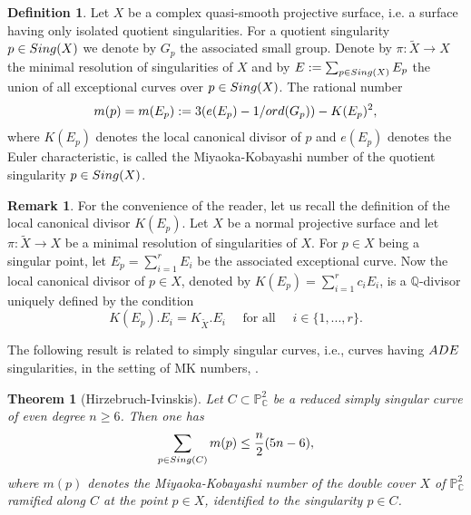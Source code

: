 \documentclass[11pt]{amsart}
\theoremstyle{plain}
\newtheorem{theorem}[thm]{Theorem}
\theoremstyle{definition}
\newtheorem{definition}[thm]{Definition}
\newtheorem{remark}[thm]{Remark}
\numberwithin{equation}{section}
\begin{document}
\begin{definition}
\label{D1}
Let $X$ be a complex quasi-smooth projective surface, i.e. a surface having only isolated quotient singularities. For a quotient singularity  $p \in {\rm Sing}(X)$ we denote by $G_{p}$ the associated small group. Denote by $\pi : \tilde{X} \rightarrow X$ the minimal resolution of singularities of $X$ and by $E:=\sum_{p \in {\rm Sing}(X)}E_{p}$ the union of all exceptional curves over $p \in {\rm Sing}(X)$. The rational number
$$m(p)=m(E_{p}):=3(e(E_{p})-1/{\rm ord}(G_{p})) - K(E_{p})^{2},$$
where $K(E_{p})$ denotes the local canonical divisor of $p$ and $e(E_{p})$ denotes the Euler characteristic, is called the Miyaoka-Kobayashi number of the quotient singularity $p \in {\rm Sing}(X)$.
\begin{remark}
For the convenience of the reader, let us recall the definition of the local canonical divisor $K(E_{p})$. Let $X$ be a normal projective surface and let $\pi : \tilde{X} \rightarrow X$ be a minimal resolution of singularities of $X$. For $p \in X$ being a singular point, let $E_{p} = \sum_{i=1}^{r}E_{i}$ be the associated exceptional curve. Now the local canonical divisor of $p\in X$, denoted by $K(E_{p}) = \sum_{i=1}^{r}c_{i}E_{i}$, is a $\mathbb{Q}$-divisor uniquely defined by the condition
$$K(E_{p}).E_{i} = K_{\tilde{X}}.E_{i} \quad \text{ for all } \quad i \in \{1, ..., r\}.$$
\end{remark}
\end{definition}
The following result is related to simply singular curves, i.e., curves having ${\rm ADE}$ singularities, in the setting of MK numbers, \cite{Hirzebruch}.
\begin{theorem}[Hirzebruch-Ivinskis]
\label{thm1}
Let $C \subset \mathbb{P}^{2}_{\mathbb{C}}$ be a reduced simply singular curve of even degree $n\geq 6$. Then one has
$$\sum_{p \in {\rm Sing}(C)}m(p)\leq \frac{n}{2}(5n-6),$$
where $m(p)$ denotes the Miyaoka-Kobayashi number of the double cover $X$ of  $\mathbb{P}^{2}_{\mathbb{C}}$ ramified along $C$ at the point $p\in X$, identified to the singularity $p \in C$.
\end{theorem}
\end{document}

